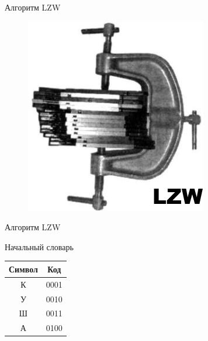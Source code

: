 \documentclass[11pt]{beamer}
\begin{document}
\begin{frame}{Алгоритм LZW}
\begin{figure}[H]
	\begin{center}
		\includegraphics[scale=1]{../pics/LZW/logo.jpg}
	\end{center}
\end{figure}



\begin{frame}{Алгоритм LZW}
\begin{block}{Начальный словарь}
\renewcommand{\arraystretch}{1.5}
\begin{table}[H]
\begin{center}
	\begin{tabular}{|c|c|}
		\hline	
		Символ & Код \\
		\hline
		  К    & 0001 \\
		\hline
		  У	   & 0010 \\
		\hline  
	  	  Ш	   & 0011 \\
		\hline  	
		  А    & 0100 \\
		\hline
	\end{tabular}
\end{center}
\end{table}
\end{block}				
\end{frame}



\end{frame}
\end{document}

